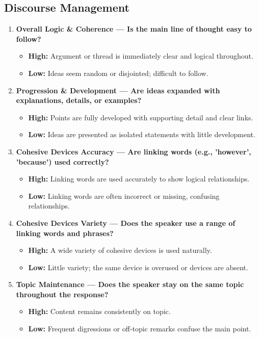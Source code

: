 \documentclass{report}
\begin{document}
\subsection*{Discourse Management}
\begin{enumerate}
  \item \textbf{Overall Logic \& Coherence — Is the main line of thought easy to follow?}
  \begin{itemize}
    \item \textbf{High:} Argument or thread is immediately clear and logical throughout.
    \item \textbf{Low:} Ideas seem random or disjointed; difficult to follow.
  \end{itemize}

  \item \textbf{Progression \& Development — Are ideas expanded with explanations, details, or examples?}
  \begin{itemize}
    \item \textbf{High:} Points are fully developed with supporting detail and clear links.
    \item \textbf{Low:} Ideas are presented as isolated statements with little development.
  \end{itemize}

  \item \textbf{Cohesive Devices Accuracy — Are linking words (e.g., 'however', 'because') used correctly?}
  \begin{itemize}
    \item \textbf{High:} Linking words are used accurately to show logical relationships.
    \item \textbf{Low:} Linking words are often incorrect or missing, confusing relationships.
  \end{itemize}

  \item \textbf{Cohesive Devices Variety — Does the speaker use a range of linking words and phrases?}
  \begin{itemize}
    \item \textbf{High:} A wide variety of cohesive devices is used naturally.
    \item \textbf{Low:} Little variety; the same device is overused or devices are absent.
  \end{itemize}

  \item \textbf{Topic Maintenance — Does the speaker stay on the same topic throughout the response?}
  \begin{itemize}
    \item \textbf{High:} Content remains consistently on topic.
    \item \textbf{Low:} Frequent digressions or off‑topic remarks confuse the main point.
  \end{itemize}


\end{enumerate}
\end{document}
